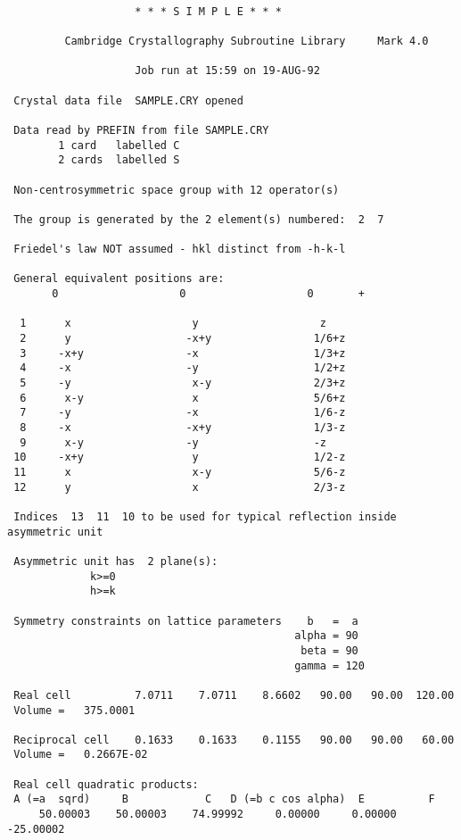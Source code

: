 {\label{simple:out}
\begin{verbatim}

                    * * * S I M P L E * * *

         Cambridge Crystallography Subroutine Library     Mark 4.0

                    Job run at 15:59 on 19-AUG-92

 Crystal data file  SAMPLE.CRY opened

 Data read by PREFIN from file SAMPLE.CRY
        1 card   labelled C
        2 cards  labelled S

 Non-centrosymmetric space group with 12 operator(s)

 The group is generated by the 2 element(s) numbered:  2  7

 Friedel's law NOT assumed - hkl distinct from -h-k-l

 General equivalent positions are:
       0                   0                   0       + 

  1      x                   y                   z       
  2      y                  -x+y                1/6+z    
  3     -x+y                -x                  1/3+z    
  4     -x                  -y                  1/2+z    
  5     -y                   x-y                2/3+z    
  6      x-y                 x                  5/6+z    
  7     -y                  -x                  1/6-z    
  8     -x                  -x+y                1/3-z    
  9      x-y                -y                  -z       
 10     -x+y                 y                  1/2-z    
 11      x                   x-y                5/6-z    
 12      y                   x                  2/3-z    

 Indices  13  11  10 to be used for typical reflection inside asymmetric unit

 Asymmetric unit has  2 plane(s):
             k>=0        
             h>=k        

 Symmetry constraints on lattice parameters    b   =  a  
                                             alpha = 90
                                              beta = 90
                                             gamma = 120

 Real cell          7.0711    7.0711    8.6602   90.00   90.00  120.00
 Volume =   375.0001

 Reciprocal cell    0.1633    0.1633    0.1155   90.00   90.00   60.00
 Volume =   0.2667E-02

 Real cell quadratic products:
 A (=a  sqrd)     B            C   D (=b c cos alpha)  E          F 
     50.00003    50.00003    74.99992     0.00000     0.00000   -25.00002


\end{verbatim}}
